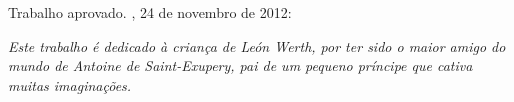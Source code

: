 \documentclass[12pt,openright,twoside,a4paper]{abntex2}
\begin{document}
%
% 
%
\begin{folhadeaprovacao}

  \begin{center}
    \vspace*{1cm}
    {\ABNTEXchapterfont\large\imprimirautor}

    \vspace*{\fill}\vspace*{\fill}
    {\ABNTEXchapterfont\Large\imprimirtitulo}
    \vspace*{\fill}
    
    \hspace{.45\textwidth}
    \begin{minipage}{.5\textwidth}
        \imprimirpreambulo
    \end{minipage}%
    \vspace*{\fill}
   \end{center}
    
   Trabalho aprovado. \imprimirlocal, 24 de novembro de 2012:

      
   \begin{center}
    \vspace*{0.5cm}
    {\large\imprimirlocal}
    \par
    {\large\imprimirdata}
    \vspace*{1cm}
  \end{center}
  
\end{folhadeaprovacao}

\begin{dedicatoria}
   \vspace*{\fill}
\noindent\textit{Este trabalho é dedicado à criança de León Werth, por ter sido
o maior amigo do mundo de Antoine de Saint-Exupery, pai de um pequeno príncipe que cativa muitas
imaginações.}
 \vspace*{\fill}
\end{dedicatoria}
\end{document}
